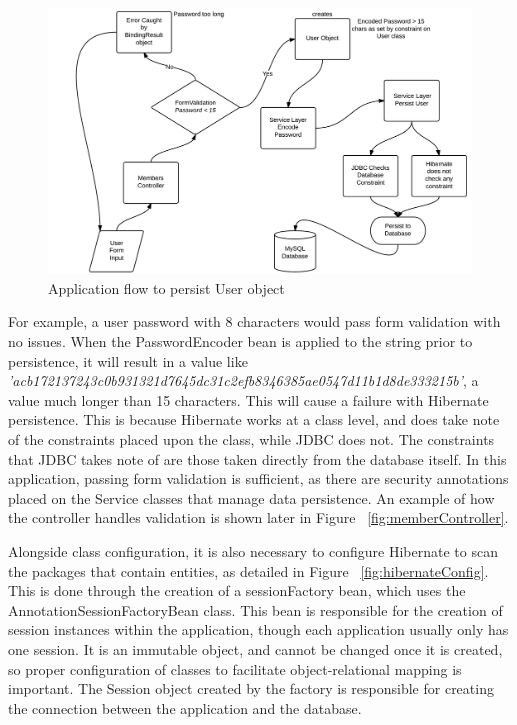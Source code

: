 \begin{figure}[H]
\begin{center}
\includegraphics[width=14cm]{dbflow.png}
\end{center}
\caption{Application flow to persist User object}
\label{fig:dbflow}
\end{figure}

For example, a user password with 8 characters would pass form validation with no issues. When the PasswordEncoder bean is applied to the string prior to persistence, it will result in a value like \textit{'acb172137243c0b931321d7645dc31c2efb8346385ae0547d11b1d8de333215b'}, a value much longer than 15 characters. This will cause a failure with Hibernate persistence. This is because Hibernate works at a class level, and does take note of the constraints placed upon the class, while JDBC does not. The constraints that JDBC takes note of are those taken directly from the database itself. In this application, passing form validation is sufficient, as there are security annotations placed on the Service classes that manage data persistence. An example of how the controller handles validation is shown later in Figure ~\ref{fig:memberController}. 

Alongside class configuration, it is also necessary to configure Hibernate to scan the packages that contain entities, as detailed in Figure ~\ref{fig:hibernateConfig}. This is done through the creation of a sessionFactory bean, which uses the AnnotationSessionFactoryBean class. This bean is responsible for the creation of session instances within the application, though each application usually only has one session. It is an immutable object, and cannot be changed once it is created, so proper configuration of classes to facilitate object-relational mapping is important. The Session object created by the factory is responsible for creating the connection between the application and the database.

